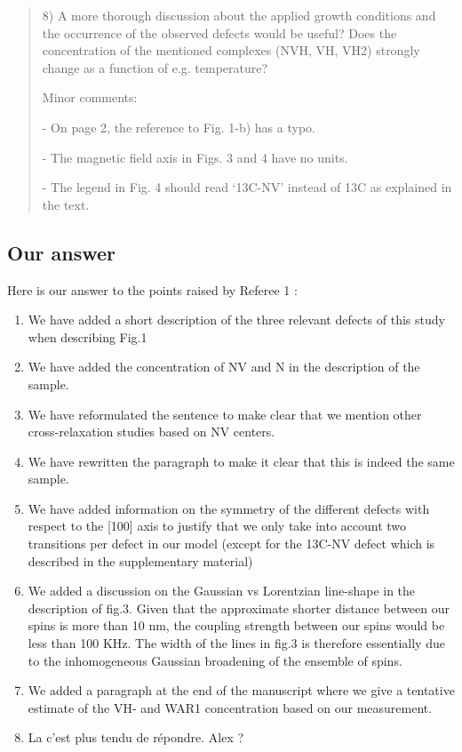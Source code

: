 \documentclass{article}
\begin{document}
\begin{quote}
8) A more thorough discussion about the applied growth conditions and the occurrence of the observed defects would be useful? Does the concentration of the mentioned complexes (NVH, VH, VH2) strongly change as a function of e.g. temperature?

Minor comments:

- On page 2, the reference to Fig. 1-b) has a typo.

- The magnetic field axis in Figs. 3 and 4 have no units.

- The legend in Fig. 4 should read ‘13C-NV’ instead of 13C as explained in the text.
\end{quote}

\subsection*{Our answer}
Here is our answer to the points raised by Referee 1 :
\begin{enumerate}
\item We have added a short description of the three relevant defects of this study when describing Fig.1
\item We have added the concentration of NV and N in the description of the sample.
\item We have reformulated the sentence to make clear that we mention other cross-relaxation studies based on NV centers.
\item We have rewritten the paragraph to make it clear that this is indeed the same sample.
\item We have added information on the symmetry of the different defects with respect to the [100] axis to justify that we only take into account two transitions per defect in our model (except for the 13C-NV defect which is described in the supplementary material)
\item We added a discussion on the Gaussian vs Lorentzian line-shape in the description of fig.3. Given that the approximate shorter distance between our spins is more than 10 nm, the coupling strength between our spins would be less than 100 KHz. The width of the lines in fig.3 is therefore essentially due to the inhomogeneous Gaussian broadening of the ensemble of spins.
\item We added a paragraph at the end of the manuscript where we give a tentative estimate of the VH- and WAR1 concentration based on our measurement.
\item La c'est plus tendu de répondre. Alex ?
\end{enumerate}
\end{document}

